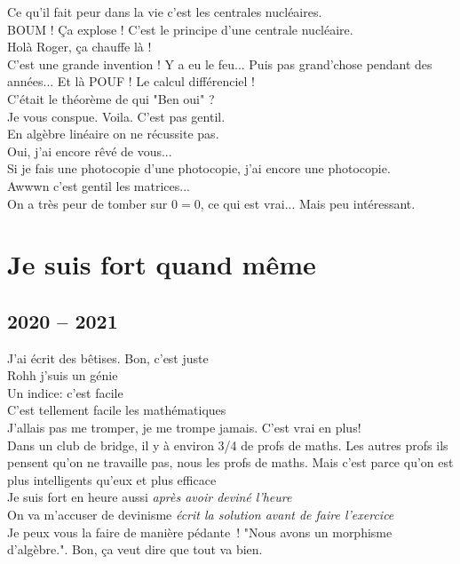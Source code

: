 \documentclass[french, a4paper, openany]{book}
\begin{document}
	\noindent \og Ce qu'il fait peur dans la vie c'est les centrales nucléaires. \fg \\
	\og BOUM ! Ça explose ! C'est le principe d'une centrale nucléaire. \fg \\
	\og Holà Roger, ça chauffe là ! \fg \\
	\og C'est une grande invention ! Y a eu le feu... Puis pas grand'chose pendant des années... Et là POUF ! Le calcul différenciel ! \fg \\
	\og C'était le théorème de qui "Ben oui" ? \fg \\
	\og Je vous conspue. Voila. C'est pas gentil. \fg \\
	\og En algèbre linéaire on ne récussite pas. \fg \\
	\og Oui, j'ai encore rêvé de vous... \fg \\
	\og Si je fais une photocopie d'une photocopie, j'ai encore une photocopie. \fg \\
	\og Awwwn c'est gentil les matrices... \fg \\
	\og On a très peur de tomber sur $0 = 0$, ce qui est vrai... Mais peu intéressant. \fg \\

\chapter{Je suis fort quand même}

\section{2020 -- 2021}

	\noindent \og J'ai écrit des bêtises. Bon, c'est juste \fg \\
	\og Rohh j'suis un génie \fg \\
	\og Un indice: c'est facile \fg \\
	\og C'est tellement facile les mathématiques \fg \\
	\og J'allais pas me tromper, je me trompe jamais. C'est vrai en plus! \fg \\
	\og Dans un club de bridge, il y à environ 3/4 de profs de maths. Les autres profs ils pensent qu'on ne travaille pas, nous les profs de maths. Mais c'est parce qu'on est plus intelligents qu'eux et plus efficace \fg \\
	\og Je suis fort en heure aussi \fg \emph{après avoir deviné l'heure} \\
	\og On va m'accuser de devinisme \fg \emph{écrit la solution avant de faire l'exercice} \\
	\og Je peux vous la faire de manière pédante~! "Nous avons un morphisme d'algèbre.". Bon, ça veut dire que tout va bien. \fg \\
	
\end{document}
